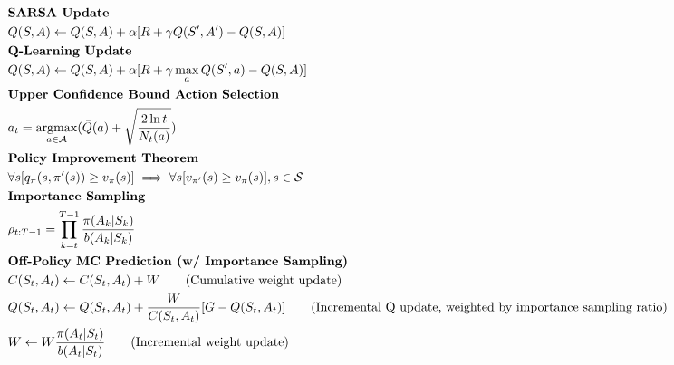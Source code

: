 \documentclass{article}
\DeclareMathOperator*{\argmax}{argmax}
\begin{document}
\begin{align*}
	 & \text{\textbf{SARSA Update}}                                                                                                                            \\
	 & Q(S,A) \leftarrow Q(S,A) + \alpha[R + \gamma Q(S',A') - Q(S,A)]                                                                                         \\
	 & \text{\textbf{Q-Learning Update}}                                                                                                                       \\
	 & Q(S,A) \leftarrow Q(S,A) + \alpha[R + \gamma \max_a Q(S',a) - Q(S,A)]                                                                                   \\
	 & \text{\textbf{Upper Confidence Bound Action Selection}}                                                                                                 \\
	 & a_t = \argmax_{a \in \mathcal{A}}(\bar{Q}(a) + \sqrt{\frac{2 \ln{t}}{N_t(a)}})                                                                          \\
	 & \text{\textbf{Policy Improvement Theorem}}                                                                                                              \\
	 & \forall s [q_\pi(s, \pi'(s)) \ge v_\pi(s)] \implies \forall s[v_{\pi'}(s) \ge v_\pi(s)], s \in \mathcal{S}                                              \\
	 & \text{\textbf{Importance Sampling}}                                                                                                                     \\
	 & \rho_{t:T-1} = \prod_{k=t}^{T-1}{\frac{\pi(A_k|S_k)}{b(A_k|S_k)}}                                                                                       \\
	 & \text{\textbf{Off-Policy MC Prediction (w/ Importance Sampling)}}                                                                                       \\
	 & C(S_t, A_t) \leftarrow C(S_t, A_t) + W \qquad \text{(Cumulative weight update)}                                                                         \\
	 & Q(S_t, A_t) \leftarrow Q(S_t, A_t) + \frac{W}{C(S_t, A_t)}[G - Q(S_t, A_t)] \qquad \text{(Incremental Q update, weighted by importance sampling ratio)} \\
	 & W \leftarrow W \frac{\pi(A_t|S_t)}{b(A_t|S_t)} \qquad \text{(Incremental weight update)}                                                                \\

\end{align*}
\end{document}
